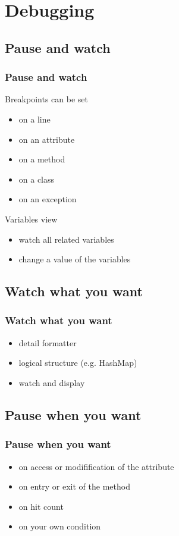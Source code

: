 \documentclass{beamer}
\begin{document}
\section{Debugging}

\subsection{Pause and watch}
\begin{frame}[fragile]
\frametitle{Pause and watch}
Breakpoints can be set
\begin{itemize}
\item on a line
\item on an attribute
\item on a method
\item on a class
\item on an exception
\end{itemize}
Variables view
\begin{itemize}
\item watch all related variables
\item change a value of the variables
\end{itemize}
\end{frame}

\subsection{Watch what you want}
\begin{frame}[fragile]
\frametitle{Watch what you want}
\begin{itemize}
\item detail formatter
\item logical structure (e.g. HashMap)
\item watch and display
\end{itemize}  
\end{frame}

\subsection{Pause when you want}
\begin{frame}[fragile]
\frametitle{Pause when you want}
\begin{itemize}
\item on access or modifification of the attribute
\item on entry or exit of the method
\item on hit count
\item on your own condition
\end{itemize}
\end{frame}
\end{document}
